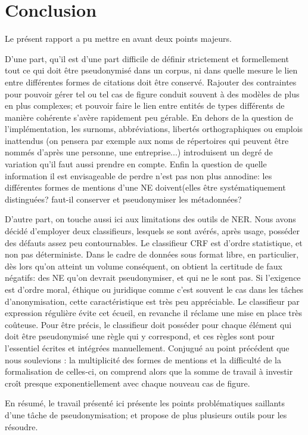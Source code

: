 \documentclass{article}
\begin{document}
\section{Conclusion}
\par
Le présent rapport a pu mettre en avant deux points majeurs.
\par
D'une part, qu'il est d'une part difficile de définir strictement et formellement tout ce qui doit être pseudonymisé dans un corpus, ni dans quelle mesure le lien entre différentes formes de citations doit être conservé.
Rajouter des contraintes pour pouvoir gérer tel ou tel cas de figure conduit souvent à des modèles de plus en plus complexes; et pouvoir faire le lien entre entités de types différents de manière cohérente s'avère rapidement peu gérable.
En dehors de la question de l'implémentation, les surnoms, abbréviations, libertés orthographiques  ou emplois inattendus (on pensera par exemple aux noms de répertoires qui peuvent être nommés d'après une personne, une entreprise...) introduisent un degré de variation qu'il faut aussi prendre en compte.
Enfin la question de quelle information il est envisageable de perdre n'est pas non plus annodine: les différentes formes de mentions d'une NE doivent(elles être systématiquement distinguées? faut-il conserver et pseudonymiser les métadonnées?
\par
D'autre part, on touche aussi ici aux limitations des outils de NER.
Nous avons décidé d'employer deux classifieurs, lesquels se sont avérés, après usage, posséder des défauts assez peu contournables.
Le classifieur CRF est d'ordre statistique, et non pas déterministe.
Dans le cadre de données sous format libre, en particulier, dès lors qu'on atteint un volume conséquent, on obtient la certitude de faux négatifs: des NE qu'on devrait pseudonymiser, et qui ne le sont pas.
Si l'exigence est d'ordre moral, éthique ou juridique comme c'est souvent le cas dans les tâches d'anonymisation, cette caractéristique est très peu appréciable.
Le classifieur par expression régulière évite cet écueil, en revanche il réclame une mise en place très coûteuse.
Pour être précis, le classifieur doit posséder pour chaque élément qui doit être pseudonymisé une règle qui y correspond, et ces règles sont pour l'essentiel écrites et intégrées manuellement.
Conjugué au point précédent que nous soulevions : la multiplicité des formes de mentions et la difficulté de la formalisation de celles-ci, on comprend alors que la somme de travail à investir croît presque exponentiellement avec chaque nouveau cas de figure.
\par
En résumé, le travail présenté ici présente les points problématiques saillants d'une tâche de pseudonymisation; et propose de plus plusieurs outils pour les résoudre.
\end{document}
